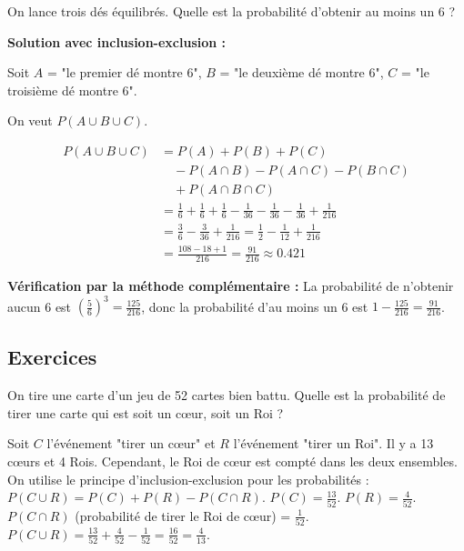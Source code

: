 \begin{examplebox}
On lance trois dés équilibrés. Quelle est la probabilité d'obtenir au moins un 6 ?

\vspace{0.3cm}
\noindent\textbf{Solution avec inclusion-exclusion :}

Soit $A$ = "le premier dé montre 6", $B$ = "le deuxième dé montre 6", $C$ = "le troisième dé montre 6".

On veut $P(A \cup B \cup C)$.

\begin{align*}
P(A \cup B \cup C) &= P(A) + P(B) + P(C) \\
&\quad - P(A \cap B) - P(A \cap C) - P(B \cap C) \\
&\quad + P(A \cap B \cap C) \\
&= \frac{1}{6} + \frac{1}{6} + \frac{1}{6} - \frac{1}{36} - \frac{1}{36} - \frac{1}{36} + \frac{1}{216} \\
&= \frac{3}{6} - \frac{3}{36} + \frac{1}{216} = \frac{1}{2} - \frac{1}{12} + \frac{1}{216} \\
&= \frac{108 - 18 + 1}{216} = \frac{91}{216} \approx 0.421
\end{align*}

\vspace{0.3cm}
\noindent\textbf{Vérification par la méthode complémentaire :}
La probabilité de n'obtenir aucun 6 est $\left(\frac{5}{6}\right)^3 = \frac{125}{216}$, donc la probabilité d'au moins un 6 est $1 - \frac{125}{216} = \frac{91}{216}$.
\end{examplebox}

\subsection{Exercices}

\begin{exercicebox}
On tire une carte d'un jeu de 52 cartes bien battu. Quelle est la probabilité de tirer une carte qui est soit un cœur, soit un Roi ?
\end{exercicebox}

\begin{correctionbox}
Soit $C$ l'événement "tirer un cœur" et $R$ l'événement "tirer un Roi".
Il y a 13 cœurs et 4 Rois. Cependant, le Roi de cœur est compté dans les deux ensembles.
On utilise le principe d'inclusion-exclusion pour les probabilités : $P(C \cup R) = P(C) + P(R) - P(C \cap R)$.
$P(C) = \frac{13}{52}$.
$P(R) = \frac{4}{52}$.
$P(C \cap R)$ (probabilité de tirer le Roi de cœur) = $\frac{1}{52}$.
$P(C \cup R) = \frac{13}{52} + \frac{4}{52} - \frac{1}{52} = \frac{16}{52} = \frac{4}{13}$.
\end{correctionbox}

